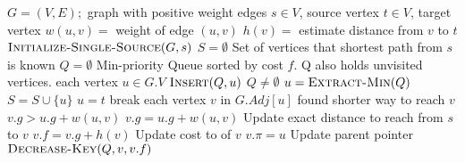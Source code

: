 \documentclass{article}
\begin{document}
\begin{codebox}
\li \Comment $G = (V,E);$ graph with positive weight edges
\li \Comment $s \in V$, source vertex
\li \Comment $t \in V$, target vertex
\li \Comment $w(u,v) = $ weight of edge $(u,v)$
\li \Comment $h(v) = $ estimate distance from $v$ to $t$  
\li
\li $\textsc{Initialize-Single-Source}(G,s)$
\li $S = \emptyset$ \hspace{0.5cm}\Comment Set of vertices that shortest path from $s$ is known  
\li $Q = \emptyset$ \hspace{0.5cm}\Comment Min-priority Queue sorted by cost $f$.
\li                 \hspace{1.5cm}\Comment Q also holds unvisited vertices.
\li \For each vertex $u \in G.V$
\li     \Do
            $\textsc{Insert}(Q,u)$
        \End
\li \While $Q \neq \emptyset$
\li     \Do
            $u = \textsc{Extract-Min}(Q)$
\li         $S = S \cup \{u\}$
\li     \If $u = t$
\li         \Do 
                break 
\li         \End
\li     \For each vertex $v$ in $G.Adj[u]$
\li         \Do
                \Comment found shorter way to reach $v$
\li             \If $v.g > u.g + w(u,v)$
\li                 \Do
                        $v.g = u.g + w(u,v)$    \hspace{0.5cm}\Comment Update exact                    distance to reach from $s$ to $v$
\li                     $v.f = v.g + h(v)$      \hspace{0.9cm}\Comment Update cost to                                               of $v$ 
\li                     $v.\pi = u$             \hspace{2.2cm}\Comment Update parent pointer
\li                     $\textsc{Decrease-Key}(Q,v,v.f)$
                    \End
            \End
        \End
\end{codebox}

\medskip
 



 
\end{document}
